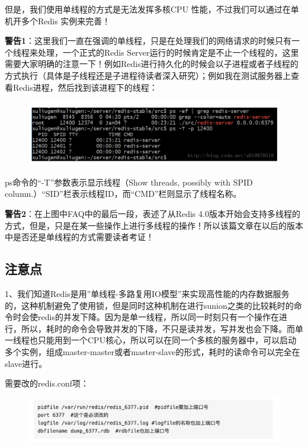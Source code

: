 \documentclass[12pt]{article}
\begin{document}
但是，我们使用单线程的方式是无法发挥多核CPU 性能，不过我们可以通过在单机开多个Redis 实例来完善！

\textbf{警告1}：这里我们一直在强调的单线程，只是在处理我们的网络请求的时候只有一个线程来处理，一个正式的Redis Server运行的时候肯定是不止一个线程的，这里需要大家明确的注意一下！例如Redis进行持久化的时候会以子进程或者子线程的方式执行（具体是子线程还是子进程待读者深入研究）；例如我在测试服务器上查看Redis进程，然后找到该进程下的线程：
\begin{figure}[H]
    \centering
    \includegraphics[width=1\textwidth]{fig/Redis_Fast_5.png}
\end{figure}

ps命令的“-T”参数表示显示线程（Show threads, possibly with SPID column.）“SID”栏表示线程ID，而“CMD”栏则显示了线程名称。

\textbf{警告2}：在上图中FAQ中的最后一段，表述了从Redis 4.0版本开始会支持多线程的方式，但是，只是在某一些操作上进行多线程的操作！所以该篇文章在以后的版本中是否还是单线程的方式需要读者考证！

\subsection{注意点}
1、我们知道Redis是用”单线程-多路复用IO模型”来实现高性能的内存数据服务的，这种机制避免了使用锁，但是同时这种机制在进行sunion之类的比较耗时的命令时会使redis的并发下降。因为是单一线程，所以同一时刻只有一个操作在进行，所以，耗时的命令会导致并发的下降，不只是读并发，写并发也会下降。而单一线程也只能用到一个CPU核心，所以可以在同一个多核的服务器中，可以启动多个实例，组成master-master或者master-slave的形式，耗时的读命令可以完全在slave进行。

需要改的redis.conf项：
\begin{figure}[H]
    \centering
    \includegraphics[width=1\textwidth]{fig/Redis_Fast_6.png}
\end{figure}
\end{document}
